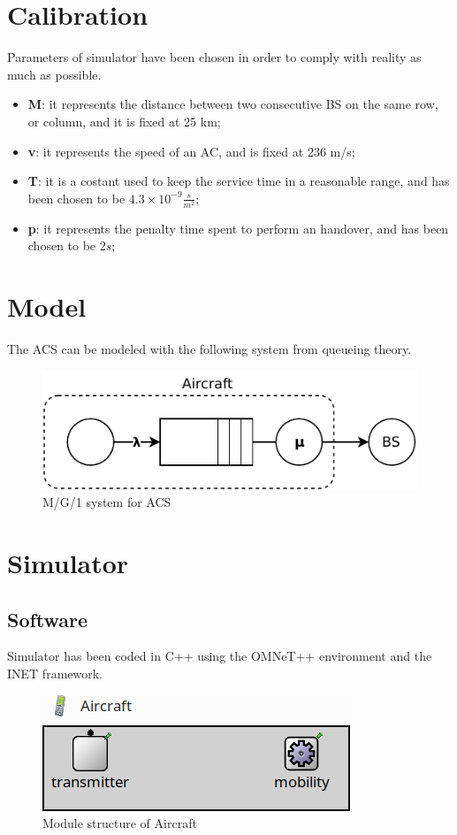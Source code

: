\documentclass[a4paper,12pt]{article}
\begin{document}
\section{Calibration}
Parameters of simulator have been chosen in order to comply with reality as much as possible.
\begin{itemize}
  \item \textbf{M}: it represents the distance between two consecutive BS on the same row, or column, and it is fixed at 25 km;
  \item \textbf{v}: it represents the speed of an AC, and is fixed at 236 m/s;
  \item \textbf{T}: it is a costant used to keep the service time in a reasonable range, and has been chosen to be $4.3 \times 10^{-9} \frac{s}{m^2}$;
  \item \textbf{p}: it represents the penalty time spent to perform an handover, and has been chosen to be $2s$;
\end{itemize}

\section{Model}
The ACS can be modeled with the following system from queueing theory.

\begin{figure}[H]
  \centering
  \includegraphics{img/model.pdf}
  \caption{M/G/1 system for ACS}
  \label{fig:model}
\end{figure}

\section{Simulator}
\subsection{Software}
Simulator has been coded in C++ using the OMNeT++ environment and the INET framework.
\begin{figure}[H]
  \centering
  \includegraphics{img/aircraft-ned.png}
  \caption{Module structure of Aircraft}
  \label{fig:aircraft-ned}
\end{figure}
\end{document}
